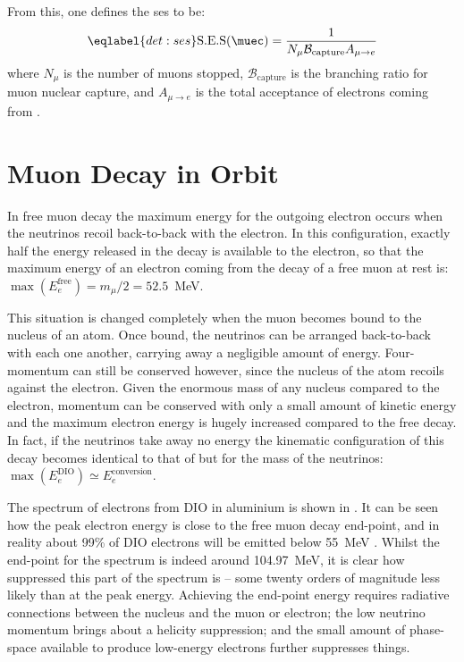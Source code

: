 From this, one defines the \acf{ses} to be:
\begin{equation}
	\eqlabel{det:ses}
\mathrm{S.E.S}(\muec)=\frac{1}{N_\mu \mathcal{B}_\mathrm{capture} A_{\mu\rightarrow e}}
\end{equation}
where $N_\mu$ is the number of muons stopped, $\mathcal{B}_\mathrm{capture}$ is the branching ratio for muon nuclear capture, and $A_{\mu\rightarrow e}$ is the total acceptance of electrons coming from \mueconv.

\section{Muon Decay in Orbit}
In free muon decay the maximum energy for the outgoing electron occurs when the neutrinos recoil back-to-back with the electron.
In this configuration, exactly half the energy released in the decay is available to the electron, so that the maximum energy of an electron coming from the decay of a free muon at rest is: $\max(E_{e}^\textrm{free})=m_\mu/2=52.5$~MeV.

This situation is changed completely when the muon becomes bound to the nucleus of an atom.
Once bound, the neutrinos can be arranged back-to-back with each one another, carrying away a negligible amount of energy.
Four-momentum can still be conserved however, since the nucleus of the atom recoils against the electron.  
Given the enormous mass of any nucleus compared to the electron, momentum can be conserved with only a small amount of kinetic energy and the maximum electron energy is hugely increased compared to the free decay.
In fact, if the neutrinos take away no energy the kinematic configuration of this decay becomes identical to that of \mueconv but for the mass of the neutrinos: $\max(E_{e}^\textrm{DIO})\simeq{}E_{e}^\textrm{conversion}$.

The spectrum of electrons from \ac{DIO} in aluminium is shown in .
It can be seen how the peak electron energy is close to the free muon decay end-point, and in reality about 99\% of \ac{DIO} electrons will be emitted below 55~MeV .
Whilst the end-point for the spectrum is indeed around 104.97~MeV, it is clear how suppressed this part of the spectrum is -- some twenty orders of magnitude less likely than at the peak energy.
Achieving the end-point energy requires radiative connections between the nucleus and the muon or electron; the low neutrino momentum brings about a helicity suppression; and the small amount of phase-space available to produce low-energy electrons further suppresses things.

